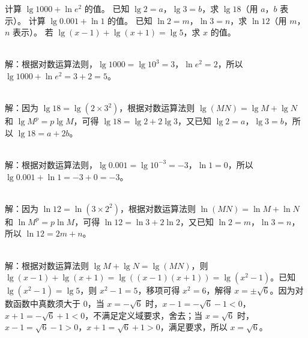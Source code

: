 \begin{Exercise}[title={常用对数和自然对数练习}, label={ex:logarithm},difficulty =3]
    \Question 计算 $\lg 1000+\ln e^2$ 的值。
    \Question 已知 $\lg 2 = a$，$\lg 3 = b$，求 $\lg 18$（用 $a$，$b$ 表示）。
    \Question 计算 $\lg 0.001+\ln 1$ 的值。
    \Question 已知 $\ln 2 = m$，$\ln 3 = n$，求 $\ln 12$（用 $m$，$n$ 表示）。
    \Question 若 $\lg (x - 1)+\lg (x + 1)= \lg 5$，求 $x$ 的值。
\end{Exercise}
\begin{MyAnswer}[ref={ex:logarithm}]
        \Question {}\\ 解：根据对数运算法则，$\lg 1000=\lg 10^3 = 3$，$\ln e^2 = 2$，所以 $\lg 1000+\ln e^2=3 + 2=5$。

        \Question {}\\ 解：因为 $\lg 18=\lg(2\times3^2)$，根据对数运算法则 $\lg(MN)=\lg M+\lg N$ 和 $\lg M^p = p\lg M$，可得 $\lg 18=\lg 2 + 2\lg 3$，又已知 $\lg 2 = a$，$\lg 3 = b$，所以 $\lg 18=a + 2b$。


        \Question {}\\ 解：根据对数运算法则，$\lg 0.001=\lg 10^{-3} = - 3$，$\ln 1 = 0$，所以 $\lg 0.001+\ln 1=-3+0=-3$。

        \Question {}\\ 解：因为 $\ln 12=\ln(3\times2^2)$，根据对数运算法则 $\ln(MN)=\ln M+\ln N$ 和 $\ln M^p = p\ln M$，可得 $\ln 12=\ln 3 + 2\ln 2$，又已知 $\ln 2 = m$，$\ln 3 = n$，所以 $\ln 12=2m + n$。

        \Question  {}\\  解：根据对数运算法则 $\lg M+\lg N=\lg(MN)$，则 $\lg (x - 1)+\lg (x + 1)=\lg((x - 1)(x + 1))=\lg(x^2 - 1)$。已知 $\lg(x^2 - 1)=\lg 5$，则 $x^2 - 1 = 5$，移项可得 $x^2 = 6$，解得 $x=\pm\sqrt{6}$。因为对数函数中真数须大于 $0$，当 $x = -\sqrt{6}$ 时，$x - 1=-\sqrt{6}-1<0$，$x + 1=-\sqrt{6}+1<0$，不满足定义域要求，舍去；当 $x=\sqrt{6}$ 时，$x - 1=\sqrt{6}-1>0$，$x + 1=\sqrt{6}+1>0$，满足要求，所以 $x=\sqrt{6}$。
\end{MyAnswer}


